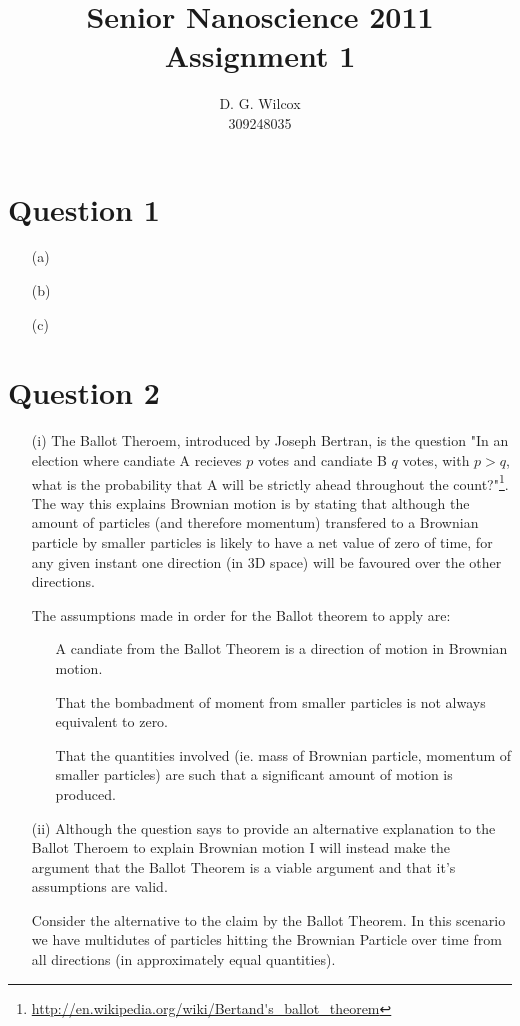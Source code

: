 \documentclass[10pt,a4paper]{article}
\title{Senior Nanoscience 2011 Assignment 1}
\date{}
\author{D. G. Wilcox \\
		309248035}
\begin{document}
\maketitle

\section*{Question 1}

\begin{itemize}
	\item[(a)]
	\item[(b)]
	\item[(c)]
\end{itemize}

\section*{Question 2}

\begin{itemize}
	\item[(i)] The Ballot Theroem, introduced by Joseph Bertran, is the question "In an election where candiate A recieves $p$ votes and candiate B $q$ votes, with $p > q$, what is the probability that A will be strictly ahead throughout the count?"\footnote{\url{http://en.wikipedia.org/wiki/Bertand's_ballot_theorem}}. The way this explains Brownian motion is by stating that although the amount of particles (and therefore momentum) transfered to a Brownian particle by smaller particles is likely to have a net value of zero of time, for any given instant one direction (in 3D space) will be favoured over the other directions.

	The assumptions made in order for the Ballot theorem to apply are:
		\begin{itemize}
			\item[\textbullet] A candiate from the Ballot Theorem is a direction of motion in Brownian motion.
			\item[\textbullet] That the bombadment of moment from smaller particles is not always equivalent to zero.
			\item[\textbullet] That the quantities involved (ie. mass of Brownian particle, momentum of smaller particles) are such that a significant amount of motion is produced.
		\end{itemize}
	\item[(ii)] Although the question says to provide an alternative explanation to the Ballot Theroem to explain Brownian motion I will instead make the argument that the Ballot Theorem is a viable argument and that it's assumptions are valid.

	Consider the alternative to the claim by the Ballot Theorem. In this scenario we have multidutes of particles hitting the Brownian Particle over time from all directions (in approximately equal quantities).
\end{itemize}
\end{document}
